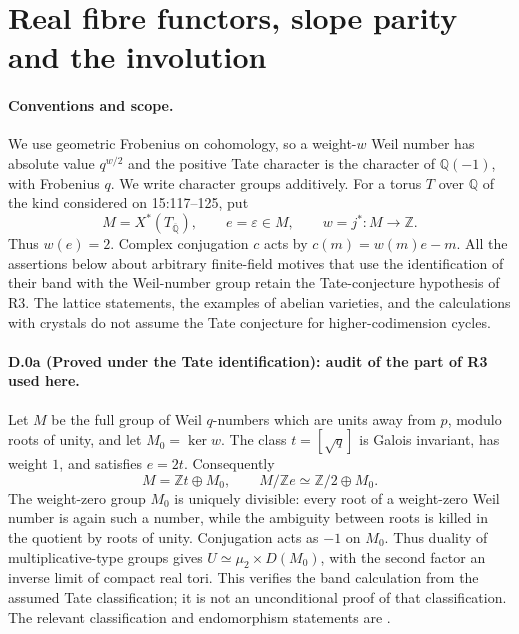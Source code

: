 \section{Real fibre functors, slope parity and the involution}
\label{sec:real-weil-D}

\paragraph{Conventions and scope.}
We use geometric Frobenius on cohomology, so a weight-$w$ Weil number has absolute
value $q^{w/2}$ and the positive Tate character is the character of $\mathbb Q(-1)$,
with Frobenius $q$. We write character groups additively. For a torus $T$ over
$\mathbb Q$ of the kind considered on 15:117--125, put
\[
 M=X^*(T_{\overline{\mathbb Q}}),\qquad e=\varepsilon\in M,
 \qquad w=j^*:M\longrightarrow\mathbb Z.
\]
Thus $w(e)=2$. Complex conjugation $c$ acts by
$c(m)=w(m)e-m$. All the assertions below about arbitrary finite-field motives
that use the identification of their band with the Weil-number group retain the
Tate-conjecture hypothesis of R3. The lattice statements, the examples of
abelian varieties, and the calculations with crystals do not assume the Tate
conjecture for higher-codimension cycles.

\paragraph{D.0a (Proved under the Tate identification): audit of the part of R3 used here.}
Let $M$ be the full group of Weil $q$-numbers which are units away from
$p$, modulo roots of unity, and let $M_0=\ker w$. The class
$t=[\sqrt q]$ is Galois invariant, has weight $1$, and satisfies $e=2t$.
Consequently
\[
 M=\mathbb Zt\oplus M_0,\qquad
 M/\mathbb Ze\simeq\mathbb Z/2\oplus M_0.
\]
The weight-zero group $M_0$ is uniquely divisible: every root of a
weight-zero Weil number is again such a number, while the ambiguity
between roots is killed in the quotient by roots of unity. Conjugation
acts as $-1$ on $M_0$. Thus duality of multiplicative-type groups gives
$U\simeq\mu_2\times D(M_0)$, with the second factor an inverse limit of
compact real tori. This verifies the band calculation from the assumed
Tate classification; it is not an unconditional proof of that
classification. The relevant classification and endomorphism statements
are \citet[Proposition 2.6 and Theorem 2.19]{D_Milne1994}.

